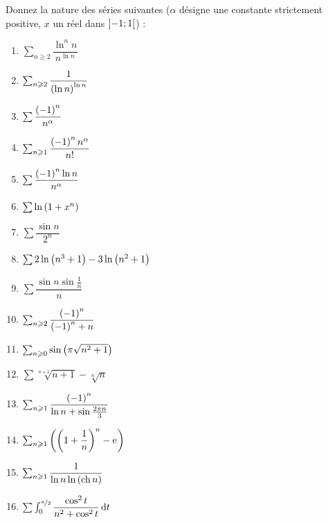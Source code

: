 \begin{exoss}[Exercice 3]
Donnez la nature des séries suivantes (\(\alpha\) désigne une constante strictement positive, \(x\) un réel dans \(\left]-1;1\right[\)) :

\begin{enumerate}
    \item \(\sum_{n\geq2}\dfrac{\ln^nn}{n^{\ln n}}\) \\
    \item \(\sum_{n\geqslant2}\dfrac{1}{\left(\ln n\right)^{\ln n}}\) \\
    \item \(\sum\dfrac{\left(-1\right)^n}{n^\alpha}\) \\
    \item \(\sum_{n\geqslant1}\dfrac{\left(-1\right)^nn^\alpha}{n!}\) \\
    \item \(\sum\dfrac{\left(-1\right)^n\ln n}{n^\alpha}\) \\
    \item \(\sum\ln\left(1+x^n\right)\) \\
    \item \(\sum\dfrac{\sin n}{2^n}\) \\
    \item \(\sum2\ln\left(n^3+1\right)-3\ln\left(n^2+1\right)\) \\
    \item \(\sum\dfrac{\sin n\sin\frac{1}{n}}{n}\) \\
    \item \(\sum_{n\geqslant2}\dfrac{\left(-1\right)^n}{\left(-1\right)^n+n}\) \\
    \item \(\sum_{n\geqslant0}\sin\left(\pi\sqrt{n^2+1}\right)\) \\
    \item \(\sum\sqrt[n+1]{n+1}-\sqrt[n]{n}\) \\
    \item \(\sum_{n\geqslant1}\dfrac{\left(-1\right)^n}{\ln n+\sin\frac{2\pi n}{3}}\) \\
    \item \(\sum_{n\geqslant1}\left(\left(1+\dfrac{1}{n}\right)^n-\mathrm{e}^{}\right)\) \\
    \item \(\sum_{n\geqslant1}\dfrac{1}{\ln n\ln\left(\operatorname{ch} n\right)}\) \\
    \item \(\sum\int_0^{\nicefrac{\pi}{2}}\dfrac{\cos^2t}{n^2+\cos^2t}\odif{t}\)
\end{enumerate}
\end{exoss}

